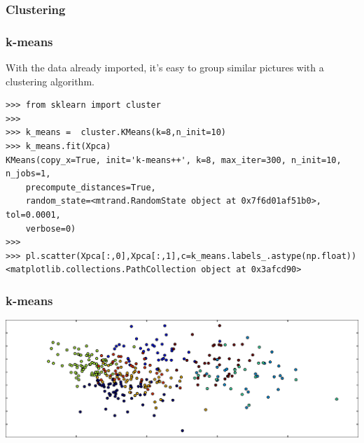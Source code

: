 \documentclass[10pt, colorlinks]{beamer}
\begin{document}
\subsubsection{Clustering}
\begin{frame}[fragile]\frametitle{k-means}
With the data already imported, it's easy to group similar pictures with a clustering algorithm.
\begin{verbatim}
>>> from sklearn import cluster
>>> 
>>> k_means =  cluster.KMeans(k=8,n_init=10)
>>> k_means.fit(Xpca)
KMeans(copy_x=True, init='k-means++', k=8, max_iter=300, n_init=10, n_jobs=1,
    precompute_distances=True,
    random_state=<mtrand.RandomState object at 0x7f6d01af51b0>, tol=0.0001,
    verbose=0)
>>> 
>>> pl.scatter(Xpca[:,0],Xpca[:,1],c=k_means.labels_.astype(np.float))
<matplotlib.collections.PathCollection object at 0x3afcd90>
\end{verbatim}

\end{frame}
\begin{frame}[fragile]\frametitle{k-means}
\includegraphics[width=\textwidth]{plwfigis/CursP_4_figure32}

\end{frame}
\end{document}
